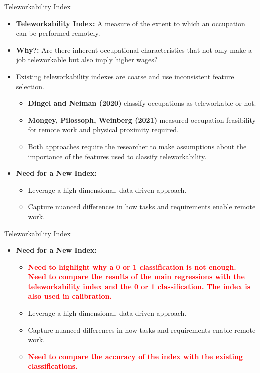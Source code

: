 \documentclass[aspectratio=1610]{beamer}
\begin{document}
\begin{frame}{Teleworkability Index}
    \begin{itemize}
        \item \textbf{Teleworkability Index:} A measure of the extent to which an occupation can be performed remotely. %
        \item \textbf{Why?:} Are there inherent occupational characteristics that not only make a job teleworkable but also imply higher wages? %
        \item Existing teleworkability indexes are coarse and use inconsistent feature selection.
        \begin{itemize}
            \item \textbf{Dingel and Neiman (2020)} classify occupations as teleworkable or not.
            \item \textbf{Mongey, Pilossoph, Weinberg (2021)} measured occupation feasibility for remote work and physical proximity required.
            \item Both approaches require the researcher to make assumptions about the importance of the features used to classify teleworkability.
        \end{itemize} %
        \item \textbf{Need for a New Index:}
            \begin{itemize}
                \item Leverage a high-dimensional, data-driven approach.
                \item Capture nuanced differences in how tasks and requirements enable remote work.
            \end{itemize}
    \end{itemize}
\end{frame}

\begin{frame}{Teleworkability Index}
    \begin{itemize}
        \item \textbf{Need for a New Index:}
            \begin{itemize}
                \item \textbf{\textcolor{red}{Need to highlight why a 0 or 1 classification is not enough. Need to compare the results of the main regressions with the teleworkability index and the 0 or 1 classification. The index is also used in calibration.}}
                \item Leverage a high-dimensional, data-driven approach.
                \item Capture nuanced differences in how tasks and requirements enable remote work.
                \item \textbf{\textcolor{red}{Need to compare the accuracy of the index with the existing classifications.}}
            \end{itemize}
    \end{itemize}
\end{frame}
\end{document}

